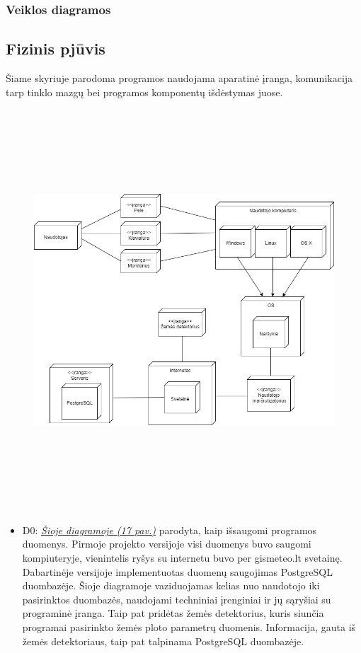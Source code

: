 \documentclass[oneside]{VUMIFPSkursinis}
\begin{document}
\subsubsection{Veiklos diagramos}
\subsection{Fizinis pjūvis}
	Šiame skyriuje parodoma programos naudojama aparatinė įranga, komunikacija tarp tinklo mazgų bei programos komponentų išdėstymas juose.
	\newline
	\vskip 0.5cm
	\begin{figure}[H]
	\centering	
	\includegraphics[width=15cm,height=15cm,keepaspectratio]{2D0.png}
	\caption{}
	\label{fig:Deployment}
\end{figure}
	\begin{itemize}
		\item D0: \hyperref[fig:Deployment]{\textit{Šioje diagramoje (17 pav.)}} parodyta, kaip išsaugomi programos duomenys. 
		Pirmoje projekto versijoje visi duomenys buvo saugomi kompiuteryje, vienintelis ryšys su internetu buvo per gismeteo.lt svetainę. Dabartinėje versijoje implementuotas duomenų saugojimas PostgreSQL duombazėje. Šioje diagramoje vaziduojamas kelias nuo naudotojo iki pasirinktos duombazės, naudojami techniniai įrenginiai ir jų sąryšiai su programinė įranga. Taip pat pridėtas žemės detektorius, kuris siunčia programai pasirinkto žemės ploto parametrų duomenis. Informacija, gauta iš žemės detektoriaus, taip pat talpinama PostgreSQL duombazėje.
	\end{itemize}



\end{document}
